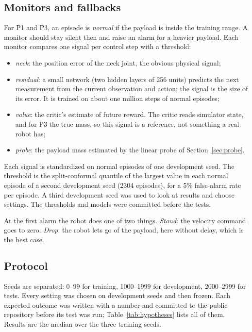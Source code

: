 \documentclass[conference]{IEEEtran}
\begin{document}
\subsection{Monitors and fallbacks}

For P1 and P3, an episode is \emph{normal} if the payload is inside the training range. A monitor should stay silent then and raise an alarm for a heavier payload.
Each monitor compares one signal per control step with a threshold:
\begin{itemize}
\item \emph{neck}: the position error of the neck joint, the obvious physical signal;
\item \emph{residual}: a small network (two hidden layers of 256 units) predicts the next measurement from the current observation and action; the signal is the size of its error. It is trained on about one million steps of normal episodes;
\item \emph{value}: the critic's estimate of future reward. The critic reads simulator state, and for P3 the true mass, so this signal is a reference, not something a real robot has;
\item \emph{probe}: the payload mass estimated by the linear probe of Section~\ref{sec:probe}.
\end{itemize}
Each signal is standardized on normal episodes of one development seed. The threshold is the split-conformal quantile \cite{angelopoulos2021gentle} of the largest value in each normal episode of a second development seed (2304 episodes), for a 5\% false-alarm rate per episode.
A third development seed was used to look at results and choose settings. The thresholds and models were committed before the tests.

At the first alarm the robot does one of two things. \emph{Stand}: the velocity command goes to zero. \emph{Drop}: the robot lets go of the payload, here without delay, which is the best case.

\subsection{Protocol}

Seeds are separated: 0--99 for training, 1000--1999 for development, 2000--2999 for tests.
Every setting was chosen on development seeds and then frozen.
Each expected outcome was written with a number and committed to the public repository before its test was run; Table~\ref{tab:hypotheses} lists all of them.
Results are the median over the three training seeds.
\end{document}
